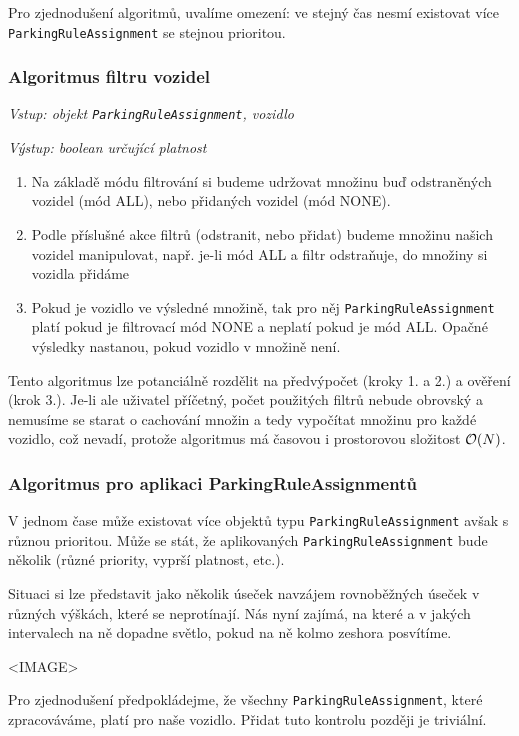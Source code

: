 Pro zjednodušení algoritmů, uvalíme omezení: ve stejný čas nesmí existovat více \texttt{ParkingRuleAssignment}
se stejnou prioritou.

\subsubsection*{Algoritmus filtru vozidel}

\textit{Vstup: objekt \texttt{ParkingRuleAssignment}, vozidlo}

\textit{Výstup: boolean určující platnost}
\begin{enumerate}
  \item Na základě módu filtrování si budeme udržovat množinu buď odstraněných vozidel (mód ALL), nebo přidaných vozidel (mód NONE).
  \item Podle příslušné akce filtrů (odstranit, nebo přidat) budeme množinu našich vozidel manipulovat, např. je-li mód ALL a filtr odstraňuje, do množiny si vozidla přidáme
  \item Pokud je vozidlo ve výsledné množině, tak pro něj \texttt{ParkingRuleAssignment} platí pokud je filtrovací mód NONE a neplatí pokud je mód ALL. Opačné výsledky nastanou, pokud vozidlo v množině není.
\end{enumerate}

Tento algoritmus lze potanciálně rozdělit na předvýpočet (kroky 1. a 2.) a ověření (krok 3.).
Je-li ale uživatel příčetný, počet použitých filtrů nebude obrovský a nemusíme se starat o cachování
množin a tedy vypočítat množinu pro každé vozidlo, což nevadí, protože algoritmus má časovou i prostorovou složitost
${\cal O}(N)$.

\subsubsection*{Algoritmus pro aplikaci ParkingRuleAssignmentů}

V jednom čase může existovat více objektů typu \texttt{ParkingRuleAssignment} avšak s různou prioritou.
Může se stát, že aplikovaných \texttt{ParkingRuleAssignment} bude několik (různé priority, vyprší platnost, etc.).

Situaci si lze představit jako několik úseček navzájem rovnoběžných úseček v různých výškách, které se neprotínají.
Nás nyní zajímá, na které a v jakých intervalech na ně dopadne světlo, pokud na ně kolmo zeshora posvítíme.

<IMAGE>

Pro zjednodušení předpokládejme, že všechny \texttt{ParkingRuleAssignment}, které zpracováváme, platí pro naše vozidlo.
Přidat tuto kontrolu později je triviální.

